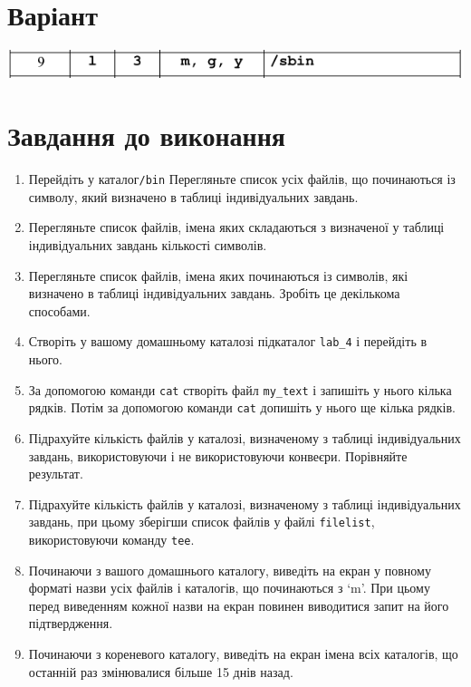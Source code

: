 \documentclass{article}
\begin{document}
 	
	
	\newpage
	\Large
	\section{Варіант}
	\includegraphics{prot.png}
	\section*{Завдання до виконання}
	\large
	\begin{enumerate}
		\item Перейдіть у каталог\verb|/bin| Перегляньте список усіх файлів, що
		починаються із символу, який визначено в таблиці індивідуальних
		завдань.
		\item Перегляньте список файлів, імена яких складаються з визначеної у
		таблиці індивідуальних завдань кількості символів.
		\item Перегляньте список файлів, імена яких починаються із символів, які
		визначено в таблиці індивідуальних завдань. Зробіть це декількома
		способами.
		\item Створіть у вашому домашньому каталозі підкаталог \verb|lab_4| і перейдіть
		в нього.
		
		\item За допомогою команди \verb|cat| створіть файл \verb|my_text| і запишіть у
		нього кілька рядків. Потім за допомогою команди \verb|cat| допишіть у
		нього ще кілька рядків.
		
		\item Підрахуйте кількість файлів у каталозі, визначеному з таблиці
		індивідуальних завдань, використовуючи і не використовуючи
		конвеєри. Порівняйте результат.
		
		\item Підрахуйте кількість файлів у каталозі, визначеному з таблиці
		індивідуальних завдань, при цьому зберігши список файлів у файлі
		\texttt{filelist}, використовуючи команду \texttt{tee}.
		
		\item Починаючи з вашого домашнього каталогу, виведіть на екран у
		повному форматі назви усіх файлів і каталогів, що починаються з ‘m’.
		При цьому перед виведенням кожної назви на екран повинен
		виводитися запит на його підтвердження.
		
		\item Починаючи з кореневого каталогу, виведіть на екран імена всіх
		каталогів, що останній раз змінювалися більше 15 днів назад.
		

\end{enumerate}
\end{document}
